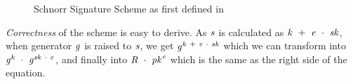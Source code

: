 \begin{figure}
    \begin{center}
        \fbox{
            \begin{varwidth}{\textwidth}
                \procedure[linenumbering, syntaxhighlight=auto]{$\procSetup{\varSecParam}$} {
                    \varKey \sample \cnstIntegersPrimeWithoutZero{\varPrime} \\
                    \pcreturn (\varSecKey \opAssign \varKey \opSeperate \varPubKey \opAssign \funGen{\varKey})
                }
                \procedure[linenumbering, syntaxhighlight=auto]{$\procSign{\varMsg}{\varSecKey}$}{
                    \varNonce \sample \cnstIntegersPrimeWithoutZero{\varPrime} \\
                    \varRand \opAssign \funGen{\varNonce} \\
                    \varSchnorrChallenge \opAssign \funHash{\varMsg \opConc \varRand \opConc \varPubKey} \\
                    \varS \opAssign \varNonce \opAddScalar \varSchnorrChallenge \opTimesScalar \varSecKey \\
                    \pcreturn \varSignature \opAssign (\varS, \varRand)
                }
                \procedure[linenumbering, syntaxhighlight=auto]{$\procVerf{\varMsg}{\varSignature}{\varPubKey}$} {
                    \varS \opAssign \opAccess{\varSignature}{\varS} \\
                    \varRand \opAssign \opAccess{\varSignature}{\varRand} \\
                    \varSchnorrChallenge \opAssign \funHash{\varMsg \opConc \varRand \opConc \varPubKey} \\
                    \pcreturn \funGen{\varS} \opEq \opPointScalar{\varRand}{\varSchnorrChallenge} \opAddPoint \varPubKey
                }
            \end{varwidth}
        }
    \end{center}
    \caption{Schnorr Signature Scheme as first defined in~\cite{schnorr1989efficient}}
    \label{fig:schnorr}
\end{figure}
\textit{Correctness} of the scheme is easy to derive. As $\mathit{s}$ is calculated as $\mathit{k} ~+~ \mathit{e} ~\cdot~ \mathit{sk}$, when generator $\mathit{g}$ is raised to $\mathit{s}$, we get
$\mathit{g}^{\mathit{k} ~+~ \mathit{e} ~\cdot~ \mathit{sk}}$ which we can transform into $\mathit{g}^{\mathit{k}} ~\cdot~ \mathit{g}^{\mathit{sk} ~\cdot~ \mathit{e}}$, and finally
into $\mathit{R} ~\cdot~ \mathit{pk}^{\mathit{e}}$ which is the same as the right side of the equation. \\


